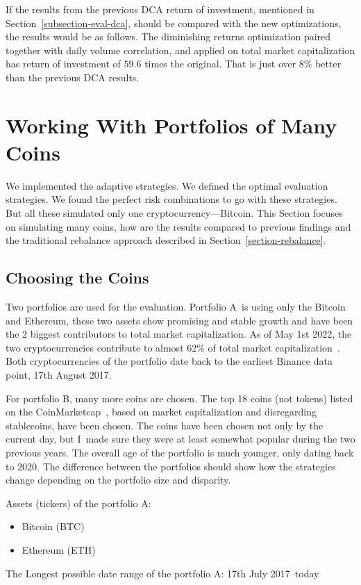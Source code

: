 If the results from the previous DCA return of investment, mentioned in Section~\ref{subsection-eval-dca}, should be compared with the new optimizations, the results would be as follows. The diminishing returns optimization paired together with daily volume correlation, and applied on total market capitalization has return of investment of $59.6$ times the original. That is just over 8\% better than the previous DCA results.

\section{Working With Portfolios of Many Coins}
We implemented the adaptive strategies. We defined the optimal evaluation strategies. We found the perfect risk combinations to go with these strategies. But all these simulated only one cryptocurrency---Bitcoin. This Section focuses on simulating many coins, how are the results compared to previous findings and the traditional rebalance approach described in Section~\ref{section-rebalance}.

\subsection*{Choosing the Coins}
Two portfolios are used for the evaluation. Portfolio A~is using only the Bitcoin and Ethereum, these two assets show promising and stable growth and have been the 2 biggest contributors to total market capitalization. As of May 1st 2022, the two cryptocurrencies contribute to almost 62\% of total market capitalization~\cite{coinmarketcap:globalmetrics}. Both cryptocurrencies of the portfolio date back to the earliest Binance data point, 17th August 2017.

For portfolio B, many more coins are chosen. The top 18 coins (not tokens) listed on the CoinMarketcap~\cite{coinmarketcap}, based on market capitalization and disregarding stablecoins, have been chosen. The coins have been chosen not only by the current day, but I~made sure they were at least somewhat popular during the two previous years. The overall age of the portfolio is much younger, only dating back to 2020. The difference between the portfolios should show how the strategies change depending on the portfolio size and disparity.

Assets (tickers) of the portfolio A:
\begin{itemize}
    \item Bitcoin (BTC)
    \item Ethereum (ETH)
\end{itemize}
The Longest possible date range of the portfolio A: 17th July 2017--today

